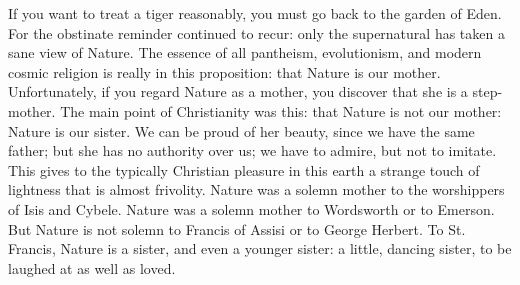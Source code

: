 If you want to treat a tiger reasonably, you must go back to the garden of Eden. For the obstinate reminder continued to recur: only the supernatural has taken a sane view of Nature. The essence of all pantheism, evolutionism, and modern cosmic religion is really in this proposition: that Nature is our mother. Unfortunately, if you regard Nature as a mother, you discover that she is a step-mother. The main point of Christianity was this: that Nature is not our mother: Nature is our sister. We can be proud of her beauty, since we have the same father; but she has no authority over us; we have to admire, but not to imitate. This gives to the typically Christian pleasure in this earth a strange touch of lightness that is almost frivolity. Nature was a solemn mother to the worshippers of Isis and Cybele. Nature was a solemn mother to Wordsworth or to Emerson. But Nature is not solemn to Francis of Assisi or to George Herbert. To St. Francis, Nature is a sister, and even a younger sister: a little, dancing sister, to be laughed at as well as loved.

